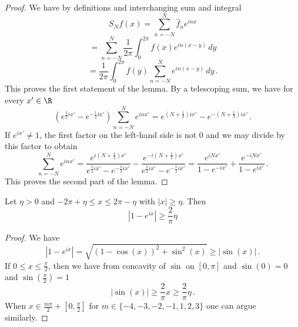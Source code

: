 \begin{proof}
\leanok
We have by definitions and interchanging sum and integral
   \begin{equation*}
        S_Nf(x)=\sum_{n=-N}^N \widehat{f}_n e^{inx}
    \end{equation*}
       \begin{equation*}
    =\sum_{n=-N}^N \frac 1{2\pi}\int_{0}^{2\pi}
    f(x) e^{in(x-y)}\, dy
    \end{equation*}
 \begin{equation}\label{eq-expsum}
     =\frac 1{2\pi}\int_{0}^{2\pi}
    f(y) \sum_{n=-N}^N e^{in(x-y)}\, dy\, .
 \end{equation}
This proves the first statement of the lemma.
By a telescoping sum, we have for every $x'\in \R$
\begin{equation}
    \left( e^{\frac 12 ix'}-e^{-\frac 12 ix'}\right) \sum_{n=-N}^N e^{inx'}= e^{(N+\frac 12) ix'}-e^{-(N+\frac 12) ix'}\, .
\end{equation}
If $e^{ix'}\neq 1$, the first factor on the left-hand side is not $0$ and we may divide by this factor to obtain
\begin{equation}
      \sum_{n=-N}^N e^{inx'}= \frac{e^{i(N+\frac 1 2)x'}}{e^{\frac 12 ix'}-e^{-\frac 12ix'}}
      -\frac{e^{-i(N+\frac 1 2)x'}}{e^{\frac 12 ix'}-e^{-\frac 12ix'}}
       =\frac{e^{iNx'}}{1-e^{-ix'}}
      +\frac {e^{-iNx'}}{1-e^{ix'}}\, .
\end{equation}
This proves the second part of the lemma.
\end{proof}

\begin{lemma}
    \label{lower-secant-bound}
    \leanok
    Let $\eta>0$ and $-2\pi +\eta \le x\le 2\pi-\eta$ with $|x|\ge \eta$. Then
    \begin{equation}
        |1-e^{ix}|\ge \frac{2}{\pi} \eta
    \end{equation}
\end{lemma}
\begin{proof}
    \leanok
    We have
    $$
        |1 - e^{ix}| = \sqrt{(1 - \cos(x))^2 + \sin^2(x)} \ge |\sin(x)|\,.
    $$
    If $0 \le x \le \frac{\pi}{2}$, then we have from concavity of $\sin$ on $[0, \pi]$ and $\sin(0) = 0$ and $\sin(\frac{\pi}{2}) = 1$
    $$
        |\sin(x)| \ge \frac{2}{\pi} x \ge \frac{2}{\pi} \eta\,.
    $$
    When $x\in \frac{m\pi}{2} + [0, \frac{\pi}{2}]$ for $m \in \{-4, -3, -2, -1, 1, 2, 3\}$ one can argue similarly.
\end{proof}

